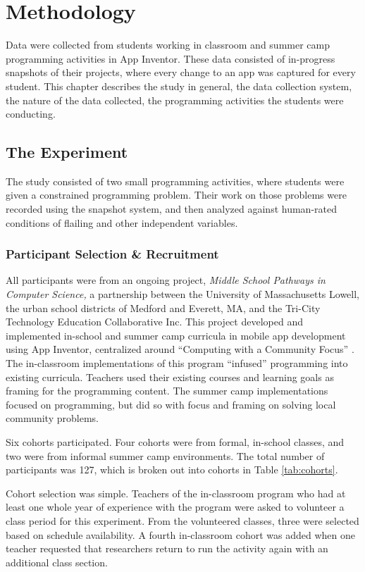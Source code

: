 \chapter{Methodology}

Data were collected from students working in classroom and summer camp programming activities in App Inventor. These data consisted of in-progress snapshots of their projects, where every change to an app was captured for every student. This chapter describes the study in general, the data collection system, the nature of the data collected, the programming activities the students were conducting.


\section{The Experiment}

The study consisted of two small programming activities, where students were given a constrained programming problem. Their work on those problems were recorded using the snapshot system, and then analyzed against human-rated conditions of flailing and other independent variables.

\subsection{Participant Selection \& Recruitment} 

All participants were from an ongoing project, \emph{Middle School Pathways in Computer Science,} a partnership between the University of Massachusetts Lowell, the urban school districts of Medford and Everett, MA, and the Tri-City Technology Education Collaborative Inc. This project developed and implemented in-school and summer camp curricula in mobile app development using App Inventor, centralized around ``Computing with a Community Focus'' \citep{Ni-2016}. The in-classroom implementations of this program ``infused'' programming into existing curricula. Teachers used their existing courses and learning goals as framing for the programming content. \label{sec:infusion} The summer camp implementations focused on programming, but did so with focus and framing on solving local community problems.

Six cohorts participated. Four cohorts were from formal, in-school classes, and two were from informal summer camp environments. The total number of participants was 127, which is broken out into cohorts in Table \ref{tab:cohorts}.

Cohort selection was simple. Teachers of the in-classroom program who had at least one whole year of experience with the program were asked to volunteer a class period for this experiment. From the volunteered classes, three were selected based on schedule availability. A fourth in-classroom cohort was added when one teacher requested that researchers return to run the activity again with an additional class section.

